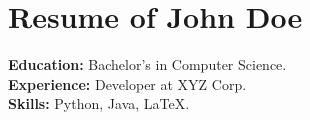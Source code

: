 \documentclass{article}
\begin{document}
    \section*{Resume of John Doe}
    \textbf{Education:} Bachelor's in Computer Science.\\
    \textbf{Experience:} Developer at XYZ Corp.\\
    \textbf{Skills:} Python, Java, LaTeX.
    
\end{document}

